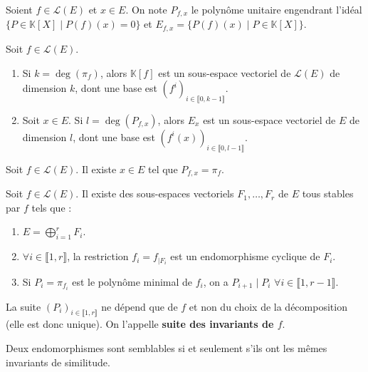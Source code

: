 
	\begin{notation}
		Soient $f \in \mathcal{L}(E)$ et $x \in E$. On note $P_{f,x}$ le polynôme unitaire engendrant l'idéal $\{ P \in \mathbb{K}[X] \mid P(f)(x) = 0 \}$ et $E_{f,x} = \{ P(f)(x) \mid P \in \mathbb{K}[X] \}$.
	\end{notation}

	\begin{lemma}
		Soit $f \in \mathcal{L}(E)$.
		\begin{enumerate}[label=(\roman*)]
			\item Si $k = \deg(\pi_f)$, alors $\mathbb{K}[f]$ est un sous-espace vectoriel de $\mathcal{L}(E)$ de dimension $k$, dont une base est $(f^i)_{i \in \llbracket 0, k-1 \rrbracket}$.
			\item Soit $x \in E$. Si $l = \deg(P_{f,x})$, alors $E_x$ est un sous-espace vectoriel de $E$ de dimension $l$, dont une base est $(f^i(x))_{i \in \llbracket 0, l-1 \rrbracket}$.
		\end{enumerate}
	\end{lemma}

	\begin{lemma}
		Soit $f \in \mathcal{L}(E)$. Il existe $x \in E$ tel que $P_{f,x} = \pi_f$.
	\end{lemma}


	\begin{theorem}[Frobenius]
		Soit $f \in \mathcal{L}(E)$. Il existe des sous-espaces vectoriels $F_1, \dots, F_r$ de $E$ tous stables par $f$ tels que :
		\begin{enumerate}[label=(\roman*)]
			\item $E = \bigoplus_{i = 1}^r F_i$.
			\item $\forall i \in \llbracket 1, r \rrbracket$, la restriction $f_i = f_{|F_i}$ est un endomorphisme cyclique de $F_i$.
			\item Si $P_i = \pi_{f_i}$ est le polynôme minimal de $f_i$, on a $P_{i+1} \mid P_i$ $\forall i \in \llbracket 1, r-1 \rrbracket$.
		\end{enumerate}
		La suite $(P_i)_{i \in \llbracket 1, r \rrbracket}$ ne dépend que de $f$ et non du choix de la décomposition (elle est donc unique). On l'appelle \textbf{suite des invariants de $f$}.
	\end{theorem}

	\begin{corollary}
		Deux endomorphismes sont semblables si et seulement s'ils ont les mêmes invariants de similitude.
	\end{corollary}

